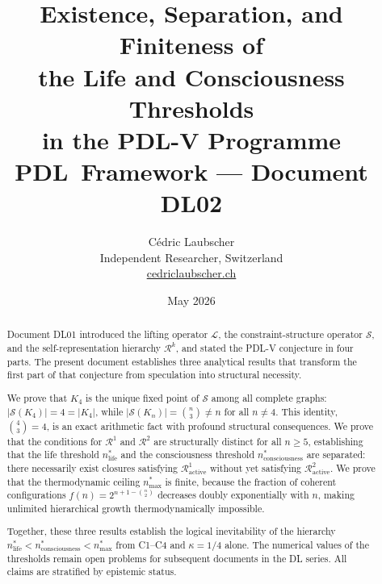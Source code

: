 \documentclass[12pt,a4paper]{article}
\theoremstyle{plain}
\theoremstyle{definition}
\theoremstyle{remark}
\newcommand{\PDL}{\textsc{PDL}}
\newcommand{\Kfour}{K_4}
\newcommand{\Sop}{\mathcal{S}}
\newcommand{\Rop}{\mathcal{R}}
\newcommand{\Lop}{\mathcal{L}}
\newcommand{\kap}{\kappa}
\newcommand{\nlife}{n^{*}_{\mathrm{life}}}
\newcommand{\ncons}{n^{*}_{\mathrm{consciousness}}}
\newcommand{\nmax}{n^{*}_{\mathrm{max}}}
\begin{document}

\title{\textbf{Existence, Separation, and Finiteness of\\
the Life and Consciousness Thresholds\\
in the \PDL-V Programme}\\[0.5em]
{\large \PDL\ Framework --- Document DL02}}

\author{Cédric Laubscher\\
\small Independent Researcher, Switzerland\\
\small \href{https://cedriclaubscher.ch}{cedriclaubscher.ch}}

\date{May 2026}
\maketitle

\begin{abstract}
Document DL01 introduced the lifting operator $\Lop$, the constraint-structure
operator $\Sop$, and the self-representation hierarchy $\Rop^k$, and stated the
\PDL-V conjecture in four parts. The present document establishes three analytical
results that transform the first part of that conjecture from speculation into
structural necessity.

We prove that $\Kfour$ is the unique fixed point of $\Sop$ among all complete graphs:
$|\Sop(\Kfour)| = 4 = |\Kfour|$, while $|\Sop(K_n)| = \binom{n}{3} \neq n$ for all
$n \neq 4$. This identity, $\binom{4}{3} = 4$, is an exact arithmetic fact with
profound structural consequences. We prove that the conditions for $\Rop^1$ and
$\Rop^2$ are structurally distinct for all $n \geq 5$, establishing that the life
threshold $\nlife$ and the consciousness threshold $\ncons$ are separated: there
necessarily exist closures satisfying $\Rop^1_{\mathrm{active}}$ without yet
satisfying $\Rop^2_{\mathrm{active}}$. We prove that the thermodynamic ceiling
$\nmax$ is finite, because the fraction of coherent configurations $f(n) =
2^{n+1-\binom{n}{2}}$ decreases doubly exponentially with $n$, making unlimited
hierarchical growth thermodynamically impossible.

Together, these three results establish the logical inevitability of the hierarchy
$\nlife < \ncons < \nmax$ from C1--C4 and $\kap = 1/4$ alone. The numerical values
of the thresholds remain open problems for subsequent documents in the DL series.
All claims are stratified by epistemic status.
\end{abstract}
\end{document}
